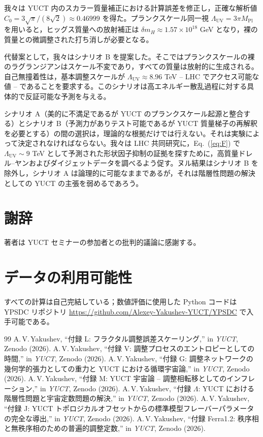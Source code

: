 \documentclass[11pt,a4paper]{article}
\newcommand{\Mpl}{M_{\mathrm{Pl}}}
\newcommand{\LUV}{\Lambda_{\mathrm{UV}}}
\theoremstyle{remark}
\begin{document}
	我々は YUCT 内のスカラー質量補正における計算誤差を修正し，正確な解析値 \(C_0 = 3\sqrt{\pi}/(8\sqrt{2}) \approx 0.46999\) を得た。プランクスケール同一視 \(\LUV = 3\pi\Mpl\) を用いると，ヒッグス質量への放射補正は \(\delta m_H \approx 1.57\times 10^{18}\) GeV となり，裸の質量との微調整された打ち消しが必要となる。
	
	代替案として，我々はシナリオ B を提案した。そこではプランクスケールの裸のラグランジアンはスケール不変であり，すべての質量は放射的に生成される。自己無撞着性は，基本調整スケールが \(\LUV \approx 8.96\) TeV – LHC でアクセス可能な値 – であることを要求する。このシナリオは高エネルギー散乱過程に対する具体的で反証可能な予測を与える。
	
	シナリオ A（美的に不満足であるが YUCT のプランクスケール起源と整合する）とシナリオ B（予測力がありテスト可能であるが YUCT 質量梯子の再解釈を必要とする）の間の選択は，理論的な根拠だけでは行えない。それは実験によって決定されなければならない。我々は LHC 共同研究に，Eq.~(\ref{eq:F}) で \(\LUV \sim 9\) TeV として予測された形状因子抑制の証拠を探すために，高質量ドレル–ヤンおよびダイジェットデータを調べるよう促す。ヌル結果はシナリオ B を除外し，シナリオ A は論理的に可能なままであるが，それは階層性問題の解決としての YUCT の主張を弱めるであろう。
	
	\section*{謝辞}
	著者は YUCT セミナーの参加者との批判的議論に感謝する。
	
	\section*{データの利用可能性}
	すべての計算は自己完結している；数値評価に使用した Python コードは YPSDC リポジトリ \url{https://github.com/Alexey-Yakushev-YUCT/YPSDC} で入手可能である。
	
	\begin{thebibliography}{99}
		 A.\,V.\,Yakushev, ``付録 L: フラクタル調整誤差スケーリング,'' in \emph{YUCT}, Zenodo (2026).
		 A.\,V.\,Yakushev, ``付録 V: 調整プロセスのエントロピーとしての時間,'' in \emph{YUCT}, Zenodo (2026).
		 A.\,V.\,Yakushev, ``付録 G: 調整ネットワークの幾何学的張力としての重力と YUCT における循環宇宙論,'' in \emph{YUCT}, Zenodo (2026).
		 A.\,V.\,Yakushev, ``付録 M: YUCT 宇宙論 – 調整相転移としてのインフレーション,'' in \emph{YUCT}, Zenodo (2026).
		 A.\,V.\,Yakushev, ``付録 \(\Lambda\): YUCT における階層性問題と宇宙定数問題の解決,'' in \emph{YUCT}, Zenodo (2026).
		 A.\,V.\,Yakushev, ``付録 J: YUCT トポロジカルオフセットからの標準模型フレーバーパラメータの完全な導出,'' in \emph{YUCT}, Zenodo (2026).
		 A.\,V.\,Yakushev, ``付録 Ferra1.2: 秩序相と無秩序相のための普遍的調整定数,'' in \emph{YUCT}, Zenodo (2026).
	\end{thebibliography}
	
\end{document}
